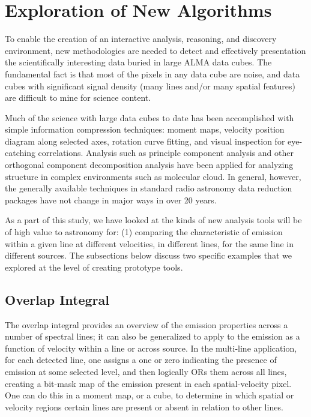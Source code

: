 \section{Exploration of New Algorithms}

To enable the creation of an interactive analysis, 
reasoning, and discovery environment, new methodologies are needed to
detect and effectively presentation the scientifically interesting data
buried in large ALMA data cubes.
The fundamental fact is that most of the pixels in any data cube are noise,
and data cubes with significant signal density (many lines and/or many spatial
features) are difficult to mine for science content. 

Much of the science with large data cubes to date has been accomplished with
simple information compression techniques: moment maps, velocity position
diagram along selected axes, rotation curve fitting, and visual inspection
for eye-catching correlations. Analysis such as principle component 
analysis and other orthogonal component decomposition analysis have been
applied for analyzing structure in complex environments such as molecular
cloud. In general, however, the generally available techniques in standard
radio astronomy data reduction packages have not change in major ways in
over 20 years.

As a part of this study, we have looked at the kinds of new analysis tools
will be of high value to astronomy for: (1) comparing the characteristic
of emission within a given line at different velocities, in  different lines,
for the same line in different sources. The subsections below discuss two
specific examples that we explored at the level of creating prototype tools.

\subsection{Overlap Integral}

The overlap integral provides an overview of the emission properties across
a number of spectral lines; it can also be generalized to apply
to the emission as a function of velocity within a line or across source. 
In the multi-line application,
for each detected line, one assigns a one or zero indicating the presence of emission
at some selected level, and
then logically ORs them across all lines, creating a bit-mask map of the emission
present in each spatial-velocity pixel. One can do this in a moment map, or a cube, to determine in
which spatial or velocity regions certain lines are present or absent in relation to
other lines. 

